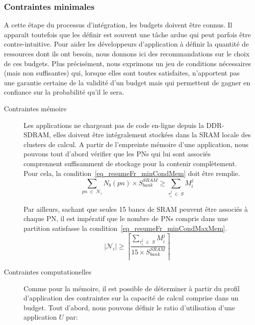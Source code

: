 \documentclass[main.tex]{subfiles}
\begin{document}
\subsubsection{Contraintes minimales}
A cette étape du processus d'intégration, les budgets doivent être connus. Il apparaît toutefois que les définir est souvent une tâche ardue qui peut parfois être contre-intuitive. Pour aider les développeurs d'application à définir la quantité de ressources dont ils ont besoin, nous donnons ici des recommandations sur le choix de ces budgets. Plus précisément, nous exprimons un jeu de conditions nécessaires (mais non suffisantes) qui, lorsque elles sont toutes satisfaites, n'apportent pas une garantie certaine de la validité d'un budget mais qui permettent de gagner en confiance sur la probabilité qu'il le sera.
\begin{description}
    \item[Contraintes mémoire]
        Les applications ne chargeant pas de code en-ligne depuis la DDR-SDRAM, elles doivent être intégralement stockées dans la SRAM locale des clusters de calcul. A partir de l'empreinte mémoire d'une application, nous pouvons tout d'abord vérifier que les PNs qui lui sont associés comprennent suffisamment de stockage pour la contenir complètement. Pour cela, la condition~\ref{eq_resumeFr_minCondMem} doit être remplie.
\begin{equation}
    \underset{pn \; \in \; \mathcal{N}_i}{\sum} N_b(pn) \times S_{bank}^{SRAM} \geq
    \underset{\tau_i^j \; \in \; S}{\sum} M_i^j
    \label{eq_resumeFr_minCondMem}
\end{equation}

    Par ailleurs, sachant que seules 15 bancs de SRAM peuvent être associés à chaque PN, il est impératif que le nombre de PNs compris dans une partition satisfasse la condition~\ref{eq_resumeFr_minCondMaxMem}.
\begin{equation}
    | \mathcal{N}_i | \geq 
    \left\lceil \dfrac{  \underset{\tau_i^j \; \in \; S}{\sum} M_i^j }{15 \times  S_{bank}^{SRAM}} \right\rceil
    \label{eq_resumeFr_minCondMaxMem}
\end{equation}


    \item[Contraintes computationelles]
        Comme pour la mémoire, il est possible de déterminer à partir du profil d'application des contraintes sur la capacité de calcul comprise dans un budget. Tout d'abord, nous pouvons définir le ratio d'utilisation d'une application $U$ par:


\end{description}
\end{document}
